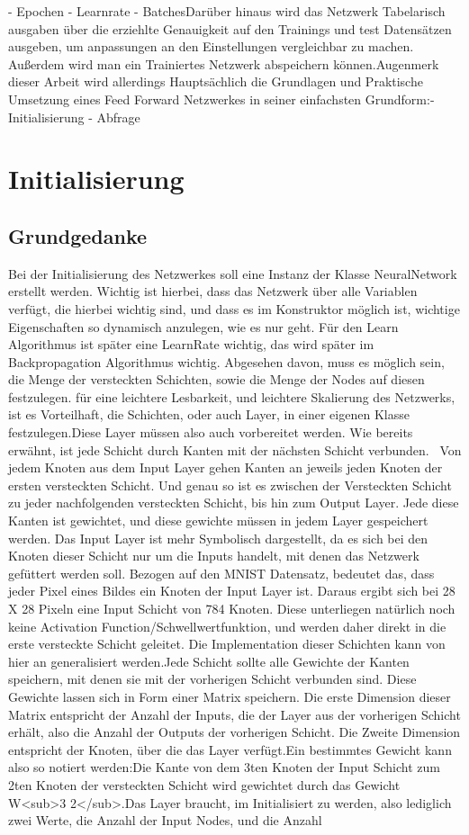 \documentclass[12pt]{article}
\begin{document}
- Epochen
- Learnrate
- BatchesDarüber hinaus wird das Netzwerk Tabelarisch ausgaben über die erziehlte Genauigkeit auf den Trainings und test Datensätzen ausgeben, um anpassungen an den Einstellungen vergleichbar zu machen.  
Außerdem wird man ein Trainiertes Netzwerk abspeichern können.Augenmerk dieser Arbeit wird allerdings Hauptsächlich die Grundlagen und Praktische Umsetzung eines Feed Forward Netzwerkes in seiner einfachsten Grundform:- Initialisierung
- Abfrage\section{ Initialisierung}\subsection{ Grundgedanke}Bei der Initialisierung des Netzwerkes soll eine Instanz der Klasse NeuralNetwork erstellt werden. Wichtig ist hierbei, dass das Netzwerk über alle Variablen verfügt, die hierbei wichtig sind, und dass es im Konstruktor möglich ist, wichtige Eigenschaften so dynamisch anzulegen, wie es nur geht. Für den Learn Algorithmus ist später eine LearnRate wichtig, das wird später im Backpropagation Algorithmus wichtig. Abgesehen davon, muss es möglich sein, die Menge der versteckten Schichten, sowie die Menge der Nodes auf diesen festzulegen. für eine leichtere Lesbarkeit, und leichtere Skalierung des Netzwerks, ist es Vorteilhaft, die Schichten, oder auch Layer, in einer eigenen Klasse festzulegen.Diese Layer müssen also auch vorbereitet werden. Wie bereits erwähnt, ist jede Schicht durch Kanten mit der nächsten Schicht verbunden.  Von jedem Knoten aus dem Input Layer gehen Kanten an jeweils jeden Knoten der ersten versteckten Schicht. Und genau so ist es zwischen der Versteckten Schicht zu jeder nachfolgenden versteckten Schicht, bis hin zum Output Layer. Jede diese Kanten ist gewichtet, und diese gewichte müssen in jedem Layer gespeichert werden. Das Input Layer ist mehr Symbolisch dargestellt, da es sich bei den Knoten dieser Schicht nur um die Inputs handelt, mit denen das Netzwerk gefüttert werden soll. Bezogen auf den MNIST Datensatz, bedeutet das, dass jeder Pixel eines Bildes ein Knoten der Input Layer ist. Daraus ergibt sich bei 28 X 28 Pixeln eine Input Schicht von 784 Knoten. Diese unterliegen natürlich noch keine Activation Function/Schwellwertfunktion, und werden daher direkt in die erste versteckte Schicht geleitet. Die Implementation dieser Schichten kann von hier an generalisiert werden.Jede Schicht sollte alle Gewichte der Kanten speichern, mit denen sie mit der vorherigen Schicht verbunden sind. Diese Gewichte lassen sich in Form einer Matrix speichern. Die erste Dimension dieser Matrix entspricht der Anzahl der Inputs, die der Layer aus der vorherigen Schicht erhält, also die Anzahl der Outputs der vorherigen Schicht. Die Zweite Dimension entspricht der Knoten, über die das Layer verfügt.Ein bestimmtes Gewicht kann also so notiert werden:Die Kante von dem 3ten Knoten der Input Schicht zum 2ten Knoten der versteckten Schicht wird gewichtet durch das Gewicht W<sub>3 2</sub>.Das Layer braucht, im Initialisiert zu werden, also lediglich zwei Werte, die Anzahl der Input Nodes, und die Anzahl 
\end{document}

